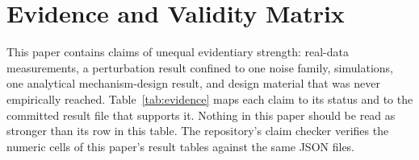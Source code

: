 \documentclass[11pt]{article}
\begin{document}
\section{Evidence and Validity Matrix}
\label{sec:matrix}

This paper contains claims of unequal evidentiary strength: real-data measurements, a perturbation result confined to one noise family, simulations, one analytical mechanism-design result, and design material that was never empirically reached. Table~\ref{tab:evidence} maps each claim to its status and to the committed result file that supports it. Nothing in this paper should be read as stronger than its row in this table. The repository's claim checker verifies the numeric cells of this paper's result tables against the same JSON files.
\end{document}
